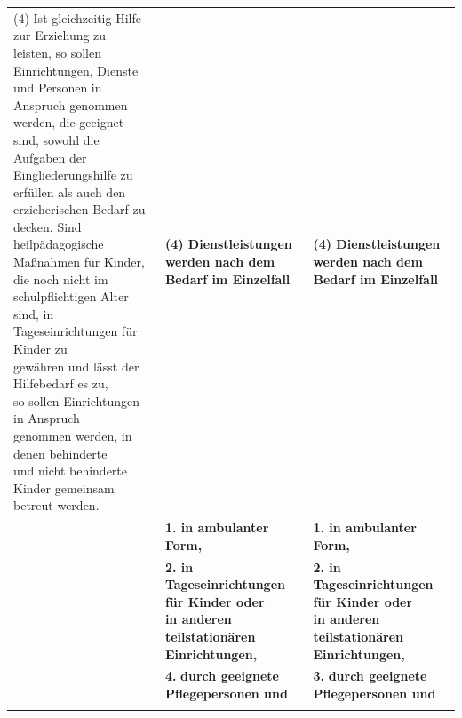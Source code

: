 \documentclass[10pt,a4paper,landscape]{article}
\begin{document}
\begin{longtable}{|L{8.2cm}|L{8.2cm}|L{8.2cm}|}
\hhline{|---|}
(4) \textcolor{diffred}{Ist gleichzeitig Hilfe zur Erziehung zu  \newline leisten, so sollen Einrichtungen, Dienste  \newline und Personen in Anspruch genommen  \newline werden, die geeignet sind, sowohl die  \newline Aufgaben der Eingliederungshilfe zu  \newline erfüllen als auch den erzieherischen} Bedarf  \newline \textcolor{diffred}{zu decken. Sind heilpädagogische  \newline Maßnahmen für Kinder, die noch nicht} im  \newline \textcolor{diffred}{schulpflichtigen Alter sind, in  \newline Tageseinrichtungen für Kinder zu  \newline gewähren und lässt der Hilfebedarf es zu,  \newline so sollen Einrichtungen in Anspruch  \newline genommen werden, in denen behinderte  \newline und nicht behinderte Kinder gemeinsam  \newline betreut werden.} & \textbf{(4) Dienstleistungen werden nach dem  \newline Bedarf im Einzelfall } & \textbf{(4) Dienstleistungen werden nach dem  \newline Bedarf im Einzelfall } \\
\hhline{|---|}
 & \textbf{1. in ambulanter Form, } & \textbf{1. in ambulanter Form, } \\
\hhline{|---|}
 & \textbf{2. in Tageseinrichtungen für Kinder oder  \newline in anderen teilstationären  \newline Einrichtungen, } & \textbf{2. in Tageseinrichtungen für Kinder oder  \newline in anderen teilstationären  \newline Einrichtungen, } \\
\hhline{|---|}
 & \textbf{\textcolor{diffred}{4.}}\textbf{ durch geeignete Pflegepersonen und } & \textbf{\textcolor{diffgreen}{3.}}\textbf{ durch geeignete Pflegepersonen und } \\
\hhline{|---|}

\end{longtable}
\end{document}
